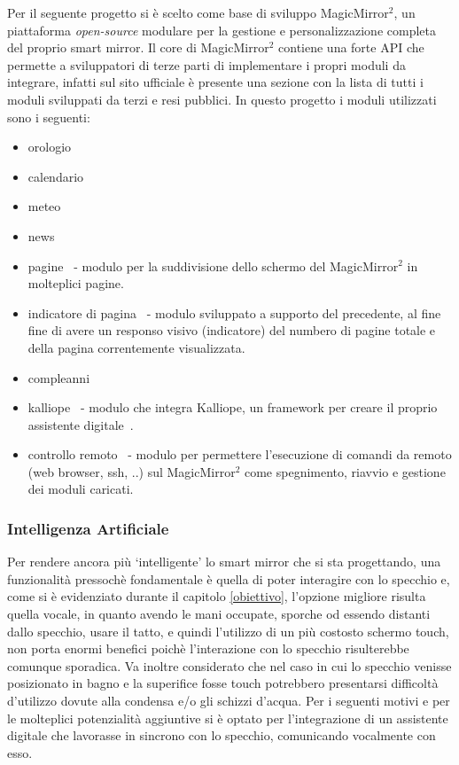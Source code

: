 \documentclass[12pt,a4paper]{article}
\begin{document}
Per il seguente progetto si \`e scelto come base di sviluppo MagicMirror$^2$\cite{MagicMirrorRepo}, un piattaforma
\textit{open-source} modulare per la gestione e personalizzazione completa del proprio smart mirror. Il core di 
MagicMirror$^2$ contiene una forte API che permette a sviluppatori di terze parti di implementare i propri moduli
da integrare, infatti sul sito ufficiale\cite{MagicMirrorSite} \`e presente una sezione con la lista di tutti i
moduli sviluppati da terzi e resi pubblici\cite{MagicMirrorModules}. In questo progetto i moduli utilizzati sono i
seguenti:
\begin{itemize}
  \item orologio
  \item calendario
  \item meteo
  \item news
  \item pagine~\cite{Pages} - modulo per la suddivisione dello schermo del MagicMirror$^2$ in molteplici pagine.
  \item indicatore di pagina~\cite{PageIndicator} - modulo sviluppato a supporto del precedente, al fine fine di
      avere un responso visivo (indicatore) del numbero di pagine totale e della pagina correntemente visualizzata.
  \item compleanni
  \item kalliope~\cite{KalliopeModule} - modulo che integra Kalliope, un framework per creare il proprio assistente
      digitale~\cite{KalliopeRepo}.
  \item controllo remoto~\cite{RemoteControl} - modulo per permettere l'esecuzione di comandi da remoto (web browser, ssh, ..)
      sul MagicMirror$^2$ come spegnimento, riavvio e gestione dei moduli caricati.
\end{itemize}

\subsubsection{Intelligenza Artificiale}\label{ai}

Per rendere ancora pi\`u `intelligente' lo smart mirror che si sta progettando, una funzionalit\`a pressoch\`e
fondamentale \`e quella di poter interagire con lo specchio e, come si \`e evidenziato durante il capitolo
\ref{obiettivo}, l'opzione migliore risulta quella vocale, in quanto avendo le mani occupate, sporche od essendo
distanti dallo specchio, usare il tatto, e quindi l'utilizzo di un pi\`u costosto schermo touch, non porta enormi benefici poich\`e
l'interazione con lo specchio risulterebbe comunque sporadica. Va inoltre considerato che nel caso in cui lo specchio venisse posizionato
in bagno e la superifice fosse touch potrebbero presentarsi difficolt\`a d'utilizzo dovute alla condensa e/o gli schizzi
d'acqua. Per i seguenti motivi e per le molteplici potenzialit\`a aggiuntive si \`e optato per l'integrazione di un
assistente digitale che lavorasse in sincrono con lo specchio, comunicando vocalmente con esso.
\end{document}
